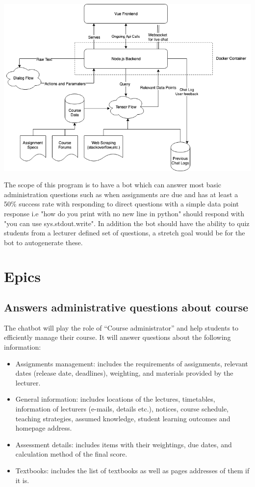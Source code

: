 \documentclass{article}
\begin{document}
\includegraphics[width=\textwidth]{architecture_diagram.png}

The scope of this program is to have a bot which can answer most basic administration questions such as when assignments are due and has at least a 50\% success rate with responding to direct questions with a simple data point response i.e 
"how do you print with no new line in python" should respond with "you can use sys.stdout.write". In addition the bot should have the ability to quiz students from a lecturer defined set of questions, a stretch goal would be for the bot to autogenerate these.

\section{Epics}
\subsection{Answers administrative questions about course}
The chatbot will play the role of “Course administrator” and help students to efficiently manage their course. It will answer questions about the following information:
\begin{itemize}
  \item Assignments management: includes the requirements of assignments, relevant dates (release date, deadlines), weighting, and materials provided by the lecturer.
  \item General information: includes locations of the lectures, timetables, information of lecturers (e-mails, details etc.), notices, course schedule, teaching strategies, assumed knowledge, student learning outcomes and homepage address.
  \item Assessment details: includes items with their weightings, due dates, and calculation method of the final score.
  \item Textbooks: includes the list of textbooks as well as pages addresses of them if it is.
\end{itemize}
\end{document}
